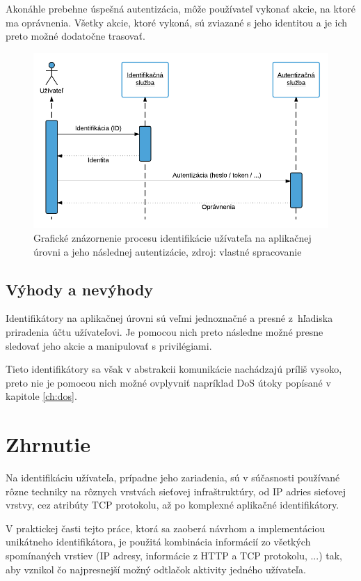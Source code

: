 \documentclass[
  digital, %
  table,   %
  lof,     %
  nolot,   %
  nocover
]{fithesis3}
\begin{document}
Akonáhle prebehne úspešná autentizácia, môže používateľ vykonať akcie, na ktoré
ma oprávnenia. Všetky akcie, ktoré vykoná, sú zviazané s jeho identitou a je ich
preto možné dodatočne trasovať.

\begin{figure}[h]
  \centering
    \includegraphics[width=.94\textwidth]{images/tech-app.png}
  \caption{Grafické znázornenie procesu identifikácie užívateľa na aplikačnej
  úrovni a jeho následnej autentizácie, zdroj: vlastné spracovanie}
  \label{fig:tech-app}
\end{figure}

\subsection{Výhody a nevýhody}
Identifikátory na aplikačnej úrovni sú veľmi jednoznačné a presné z~hľadiska
priradenia účtu užívateľovi. Je pomocou nich preto následne možné presne
sledovať jeho akcie a manipulovať s privilégiami.

Tieto identifikátory sa však v abstrakcii komunikácie nachádzajú príliš vysoko,
preto nie je pomocou nich možné ovplyvniť napríklad DoS útoky popísané v
kapitole \ref{ch:dos}.

\section{Zhrnutie}
Na identifikáciu užívateľa, prípadne jeho zariadenia, sú v súčasnosti
používané rôzne techniky na rôznych vrstvách sieťovej infraštruktúry, od IP
adries sieťovej vrstvy, cez atribúty TCP protokolu, až po komplexné aplikačné
identifikátory. 

V praktickej časti tejto práce, ktorá sa zaoberá návrhom a implementáciou
unikátneho identifikátora, je použitá kombinácia informácií zo všetkých
spomínaných vrstiev (IP adresy, informácie z HTTP a TCP protokolu, ...) tak,
aby vznikol čo najpresnejší možný odtlačok aktivity jedného užívateľa.
\end{document}
